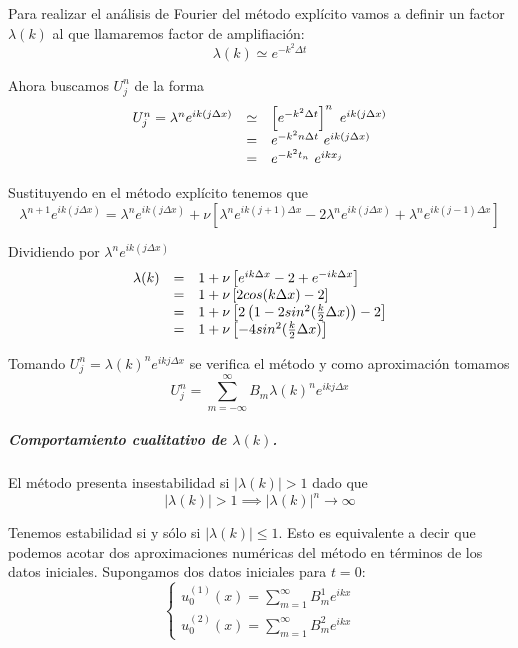 Para realizar el análisis de Fourier del método explícito vamos a definir un factor $\lambda(k)$ al que llamaremos factor de amplifiación:
$$\lambda(k) \simeq e^{-k^2\Delta t}$$ 

Ahora buscamos $U_j^n$ de la forma
\begin{equation*}
	\begin{array}{l l l}
		U_j^n =\lambda^n e^{ik(j\Delta x)}&\simeq& \left[e^{-k^2\Delta t}\right]^n\ e^{ik(j\Delta x)}\\
				&=& e^{-k^2n\Delta t}\ e^{ik(j\Delta x)}\\
				&=& e^{-k^2t_n}\ e^{ikx_j}\\
	\end{array}
\end{equation*}

Sustituyendo en el método explícito tenemos que
$$\lambda^{n+1}e^{ik(j\Delta x)} =
\lambda^ne^{ik(j\Delta x)} + \nu\left[\lambda^n e^{ik(j+1)\Delta x}-2\lambda^n e^{ik(j\Delta x)}+\lambda^n e^{ik(j-1)\Delta x}\right]$$

Dividiendo por $\lambda^n e^{ik(j\Delta x)}$
\begin{equation*}
	\begin{array}{l l l}
		\lambda(k) & = & 1+\nu\left[e^{ik\Delta x} -2 + e^{-ik\Delta x}\right]\\
		& = & 1 + \nu \left[2cos(k\Delta x)-2\right]\\
		& = & 1 + \nu \left[2\left(1-2sin^2(\frac{k}{2}\Delta x)\right)-2\right]\\
		& = & 1 + \nu \left[-4sin^2(\frac{k}{2}\Delta x)\right]\\
	\end{array}
\end{equation*}

Tomando $U_j^n = \lambda(k)^n e^{ikj\Delta x}$ se verifica el método y como aproximación tomamos
$$U_j^n = \sum_{m=-\infty}^\infty B_m \lambda(k)^n e^{ikj\Delta x}$$

\subparagraph*{Comportamiento cualitativo de $\lambda(k)$.}\mbox{}

El método presenta insestabilidad si $|\lambda(k)| > 1$ dado que $$|\lambda(k)| > 1 \implies |\lambda(k)|^n \to \infty$$ 

Tenemos estabilidad si y sólo si $|\lambda(k)| \le 1$. Esto es equivalente a decir que podemos acotar dos aproximaciones numéricas del método en términos de los datos iniciales. Supongamos dos datos iniciales para $t=0$:
\begin{equation*}
	\left\{
	\begin{array}{l}
		u_0^{(1)}(x) = \sum_{m=1}^\infty B_m^1 e^{ikx}\\
		u_0^{(2)}(x) = \sum_{m=1}^\infty B_m^2 e^{ikx}
	\end{array}
	\right.
\end{equation*}

